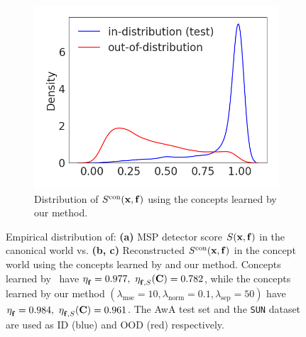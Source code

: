\begin{figure}[t]
  \hfill
  \begin{subfigure}{0.32\linewidth}
    \includegraphics[width=\textwidth]{figures/distr_msp_ours.png}
    \caption{\small Distribution of $S^{\textrm{con}}(\mathbf{x}, \mathbf{f})$ using the concepts learned by our method.}
    \label{fig:short-c}
  \end{subfigure}
  \caption{\small Empirical distribution of: \textbf{(a)} MSP detector score $S(\mathbf{x}, \mathbf{f})$ in the canonical world vs. \textbf{(b, c)} Reconstructed $S^{\textrm{con}}(\mathbf{x}, \mathbf{f})$ in the concept world using the concepts learned by \citet{yeh2020completeness} and our method.
  Concepts learned by~\citet{yeh2020completeness} have $\eta^{}_{\mathbf{f}} = 0.977, ~\eta^{}_{\mathbf{f}, S}(\mathbf{C}) = 0.782$, while the concepts learned by our method $(\lambda_\textrm{mse} = 10, \lambda_\textrm{norm} = 0.1, \lambda_\textrm{sep} = 50)$ have $\eta^{}_{\mathbf{f}} = 0.984, ~\eta^{}_{\mathbf{f}, S}(\mathbf{C}) = 0.961$. 
  The AwA test set and the \texttt{SUN} dataset are used as ID (blue) and OOD (red) respectively.
    }
    \vspace{-.1in}
\label{fig:score-distribution-msp}
\end{figure}


